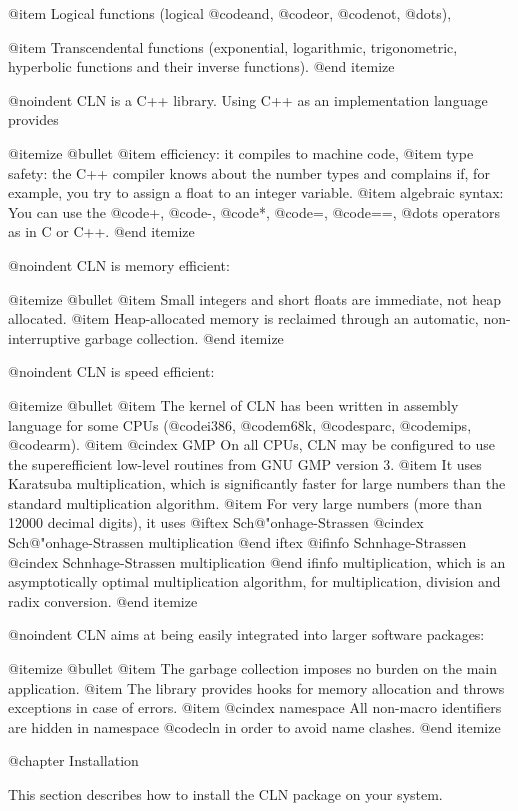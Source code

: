 @item
Logical functions (logical @code{and}, @code{or}, @code{not}, @dots{}),

@item
Transcendental functions (exponential, logarithmic, trigonometric, hyperbolic
functions and their inverse functions).
@end itemize

@noindent
CLN is a C++ library. Using C++ as an implementation language provides

@itemize @bullet
@item
efficiency: it compiles to machine code,
@item
type safety: the C++ compiler knows about the number types and complains
if, for example, you try to assign a float to an integer variable.
@item
algebraic syntax: You can use the @code{+}, @code{-}, @code{*}, @code{=},
@code{==}, @dots{} operators as in C or C++.
@end itemize

@noindent
CLN is memory efficient:

@itemize @bullet
@item
Small integers and short floats are immediate, not heap allocated.
@item
Heap-allocated memory is reclaimed through an automatic, non-interruptive
garbage collection.
@end itemize

@noindent
CLN is speed efficient:

@itemize @bullet
@item
The kernel of CLN has been written in assembly language for some CPUs
(@code{i386}, @code{m68k}, @code{sparc}, @code{mips}, @code{arm}).
@item
@cindex GMP
On all CPUs, CLN may be configured to use the superefficient low-level
routines from GNU GMP version 3.
@item
It uses Karatsuba multiplication, which is significantly faster
for large numbers than the standard multiplication algorithm.
@item
For very large numbers (more than 12000 decimal digits), it uses
@iftex
Sch{@"o}nhage-Strassen
@cindex Sch{@"o}nhage-Strassen multiplication
@end iftex
@ifinfo
Schnhage-Strassen
@cindex Schnhage-Strassen multiplication
@end ifinfo
multiplication, which is an asymptotically optimal multiplication
algorithm, for multiplication, division and radix conversion.
@end itemize

@noindent
CLN aims at being easily integrated into larger software packages:

@itemize @bullet
@item
The garbage collection imposes no burden on the main application.
@item
The library provides hooks for memory allocation and throws exceptions
in case of errors.
@item
@cindex namespace
All non-macro identifiers are hidden in namespace @code{cln} in 
order to avoid name clashes.
@end itemize


@chapter Installation

This section describes how to install the CLN package on your system.


